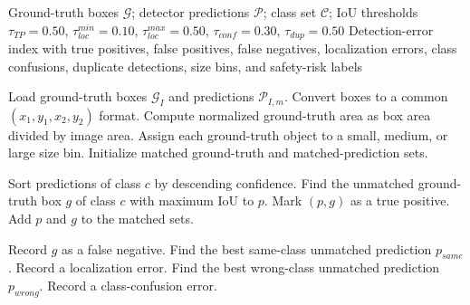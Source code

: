 \begin{algorithm}[t]
\caption{Safety-Oriented Failure Mining and Error Categorization}
\label{alg:safety_failure_mining}
\small
\begin{algorithmic}[1]
\REQUIRE Ground-truth boxes $\mathcal{G}$; detector predictions $\mathcal{P}$; class set $\mathcal{C}$; IoU thresholds $\tau_{TP}=0.50$, $\tau_{loc}^{min}=0.10$, $\tau_{loc}^{max}=0.50$, $\tau_{conf}=0.30$, $\tau_{dup}=0.50$
\ENSURE Detection-error index with true positives, false positives, false negatives, localization errors, class confusions, duplicate detections, size bins, and safety-risk labels

            \STATE Load ground-truth boxes $\mathcal{G}_{I}$ and predictions $\mathcal{P}_{I,m}$.
            \STATE Convert boxes to a common $(x_1,y_1,x_2,y_2)$ format.
            \STATE Compute normalized ground-truth area as box area divided by image area.
            \STATE Assign each ground-truth object to a small, medium, or large size bin.
            \STATE Initialize matched ground-truth and matched-prediction sets.

                \STATE Sort predictions of class $c$ by descending confidence.
                    \STATE Find the unmatched ground-truth box $g$ of class $c$ with maximum IoU to $p$.
                        \STATE Mark $(p,g)$ as a true positive.
                        \STATE Add $p$ and $g$ to the matched sets.
                    \ENDIF
                \ENDFOR
            \ENDFOR

                \STATE Record $g$ as a false negative.
                \STATE Find the best same-class unmatched prediction $p_{same}$.
                    \STATE Record a localization error.
                \ENDIF
                \STATE Find the best wrong-class unmatched prediction $p_{wrong}$.
                    \STATE Record a class-confusion error.
                \ENDIF
            \ENDFOR


\end{algorithmic}
\end{algorithm}
